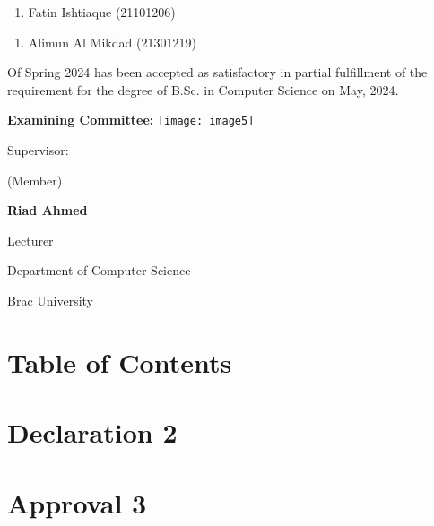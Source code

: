 \documentclass{book} %
\begin{document}
\noindent 

\begin{enumerate}
\item  Fatin Ishtiaque (21101206) 
\end{enumerate}

\noindent 

\begin{enumerate}
\item  Alimun Al Mikdad (21301219)
\end{enumerate}

\noindent \textbf{}

\noindent Of Spring 2024 has been accepted as satisfactory in partial fulfillment of the requirement for the degree of B.Sc. in Computer Science on May, 2024.

\noindent 

\noindent 

\noindent \textbf{Examining Committee: }\texttt{[image: image5]}\textbf{}

\noindent \textbf{}

\noindent Supervisor:

\noindent (Member)

                                                                   

\noindent                                  \textbf{       Riad Ahmed}

\noindent Lecturer

Department of Computer Science

                  Brac University

\noindent \textbf{}

\noindent \textbf{}

\noindent 

\noindent 

\noindent 

\noindent 

\noindent 
\chapter{Table of Contents}

\noindent 
\chapter{Declaration                     2}

\noindent 
\chapter{Approval                     3}
\end{document}
